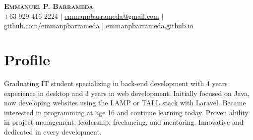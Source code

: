 \documentclass[legal,10pt]{article}
\begin{document}

\begin{center}
    \textbf{\Huge \scshape Emmanuel P. Barrameda} \\ \vspace{1pt}
    \small +63 929 416 2224 $|$ \href{mailto:emmanpbarrameda@gmail.com}{\underline{emmanpbarrameda@gmail.com}} $|$ 
    \href{https://github.com/emmanpbarrameda}{\underline{github.com/emmanpbarrameda}} $|$
    \href{https://emmanpbarrameda.github.io/}{\underline{emmanpbarrameda.github.io}}
\end{center}




\section{Profile}
\begin{justify}
Graduating IT student specializing in back-end development with 4 years experience in desktop and 3 years in web development. Initially focused on Java, now developing websites using the LAMP or TALL stack with Laravel. Became interested in programming at age 16 and continue learning today. Proven ability in project management, leadership, freelancing, and mentoring. Innovative and dedicated in every development.
\end{justify}
\end{document}
